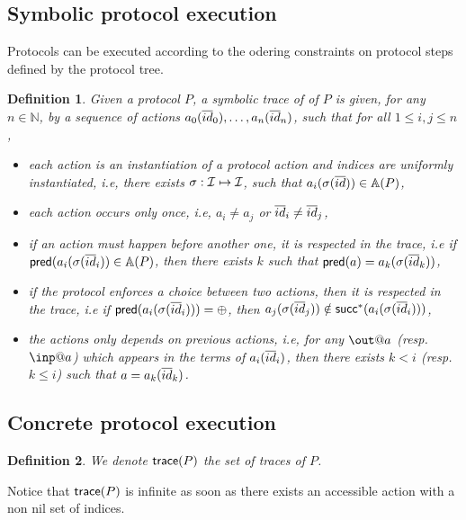 \documentclass[a4paper]{article}
\newtheorem{definition}{Definition}
\theoremstyle{remark}
\begin{document}
\subsection{Symbolic protocol execution}

Protocols can be executed according to the odering constraints on protocol steps defined by the protocol tree.
\begin{definition}
  Given a protocol $P$, a symbolic trace of of $P$ is given, for any $n\in\mathbb{N}$, by a sequence of actions $a_0 (\overline{id}_0),\dots,a_n (\overline{id}_n)$, such that for all $1 \leq i,j \leq n$,
  \begin{itemize}
    \item each action is an instantiation of a protocol action and indices are uniformly instantiated, i.e, there exists $\sigma : \mathcal{I} \mapsto \mathcal{I}$, such that $a_i (\sigma (\overline{id})) \in\mathbb{A}(P)$,
    \item each action occurs only once, i.e, $a_i \neq{} a_j$ or $\overline{id}_i \neq\overline{id}_j$,
    \item if an action must happen before another one, it is respected in the trace, i.e
      if $\textsf{pred} (a_i(\sigma(\overline{id}_i)) \in \mathbb{A}(P)$, then there exists $k$ such that $\textsf{pred}(a) = a_k(\sigma(\overline{id}_k))$,
    \item if the protocol enforces a choice between two actions, then it is respected in the trace, i.e if $\textsf{pred}(a_i(\sigma(\overline{id}_i))) = \oplus$, then $a_j(\sigma(\overline{id}_j)) \notin \textsf{succ}^*(a_i(\sigma(\overline{id}_i)))$,
      \item the actions only depends on previous actions, i.e, for any $\out@a$ (resp. $\inp@a$) which appears in the terms of $a_i(\overline{id}_i)$, then there exists $k < i$ (resp. $k \leq i$) such that $a = a_k(\overline{id}_k)$.
\end{itemize}
\end{definition}


\subsection{Concrete protocol execution}


\begin{definition}


We denote $\textsf{trace}(P)$ the set of traces of $P$.
\end{definition}
Notice that $\textsf{trace}(P)$ is infinite as soon as there exists an accessible action with a non nil set of indices.




\newpage
\end{document}
